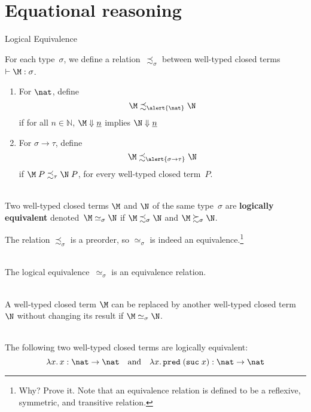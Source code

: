 \section{Equational reasoning}

\begin{frame}{Logical Equivalence}
  \begin{definition}
    For each type~$\sigma$, we define a relation~$\precsim_\sigma$ between
    well-typed closed terms $\vdash \M : \sigma$. 
    \begin{enumerate}
      \item For $\nat$, define
        \[
          \M \precsim_{\alert{\nat}} \N
        \]
        if for all $n \in \mathbb{N}$, 
          $\M \Downarrow \underline{n}$ implies $\N \Downarrow \underline{n}$
      \item For $\sigma \to \tau$, define
        \[
          \M \precsim_{\alert{\sigma \to\tau}} \N
        \]
          if $\M\;P \precsim_{\tau} \N\;P$, 
          for every well-typed closed term~$P$.
    \end{enumerate}
  \end{definition}
  ~\\

  Two well-typed closed terms $\M$ and $\N$ of the same type~$\sigma$ are
  \textbf{logically equivalent} denoted~$\M\simeq_\sigma\N$ if $\M
  \precsim_\sigma \N$ and
  $\M \succsim_\sigma \N$. 
\end{frame}

\begin{frame}
  The relation $\precsim_\sigma$ is a preorder, so
  $\simeq_\sigma$ is indeed an equivalence.\footnote{ Why? Prove it.
    Note that an equivalence relation is defined to be a reflexive, symmetric,
    and transitive relation.
  }
  \\~\\

  \begin{proposition}
    The logical equivalence~$\simeq_\sigma$ is an equivalence relation.
  \end{proposition}
  ~\\

  A well-typed closed term $\M$ can be replaced by another well-typed closed
  term $\N$ without changing
  its result if $\M \simeq_\sigma \N$.
  \\~\\
    \begin{example}
      The following two well-typed closed terms are logically equivalent:
      \[
        \lambda x.\, x : \nat \to \nat \quad\text{and}\quad
        \lambda x.\, \mathtt{pred}\; (\mathtt{suc}\; x) : \nat \to \nat
      \]
    \end{example}
\end{frame}

